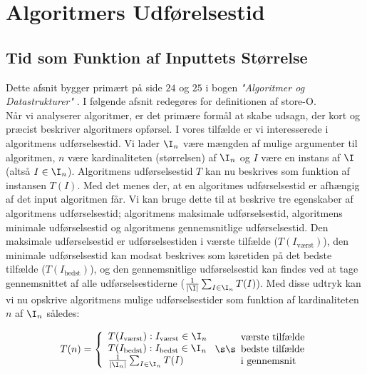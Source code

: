 \chapter{Algoritmers Udførelsestid}
\label{ch:Algoritmers Udførelsestid}

\section{Tid som Funktion af Inputtets Størrelse}
\label{sec:Tid som Funktion af Argumentets Kardinalitet}

Dette afsnit bygger primært på side $24$ og $25$ i bogen \emph{"Algoritmer og Datastrukturer"} \cite{aogd}. I følgende afsnit redegøres for definitionen af store-O.\\

Når vi analyserer algoritmer, er det primære formål at skabe udsagn, der kort og præcist beskriver algoritmers opførsel. I vores tilfælde er vi interesserede i algoritmens udførselsestid. Vi lader $\I _n$ være mængden af mulige argumenter til algoritmen, $n$ være kardinaliteten (størrelsen) af $\I _n$ og $I$ være en instans af $\I$ (altså $I \in \I _n$). Algoritmens udførselsestid $T$ kan nu beskrives som funktion af instansen $T(I)$. Med det menes der, at en algoritmes udførselsestid er afhængig af det input algoritmen får. Vi kan bruge dette til at beskrive tre egenskaber af algoritmens udførselsestid; algoritmens maksimale udførselsestid, algoritmens minimale udførselsestid og algoritmens gennemsnitlige udførselsestid. Den maksimale udførselsestid er udførselsestiden i værste tilfælde ($T(I_{\text{værst}})$), den minimale udførselsestid kan modsat beskrives som køretiden på det bedste tilfælde ($T(I_{\text{bedst}})$), og den gennemsnitlige udførselsestid kan findes ved at tage gennemsnittet af alle udførselsestiderne ($\frac{1}{|\I |} \sum_{I \in \I _n}T(I)$). Med disse udtryk kan vi nu opskrive algoritmens mulige udførselsestider som funktion af kardinaliteten $n$ af $\I _n$ således:

\[ T(n) = \left\{ \begin{array}{l}
	T(I_{\text{værst}}): I_{\text{værst}} \in \I _n  \\
	T(I_{\text{bedst}}): I_{\text{bedst}} \in \I _n  \\
	\frac{1}{|\I _n|} \sum_{I \in \I _n}T(I)
\end{array} \right.\s\s\begin{array}{l}
	\text{værste tilfælde}\\
	\text{bedste tilfælde}\\
	\text{i gennemsnit}
\end{array}\]

